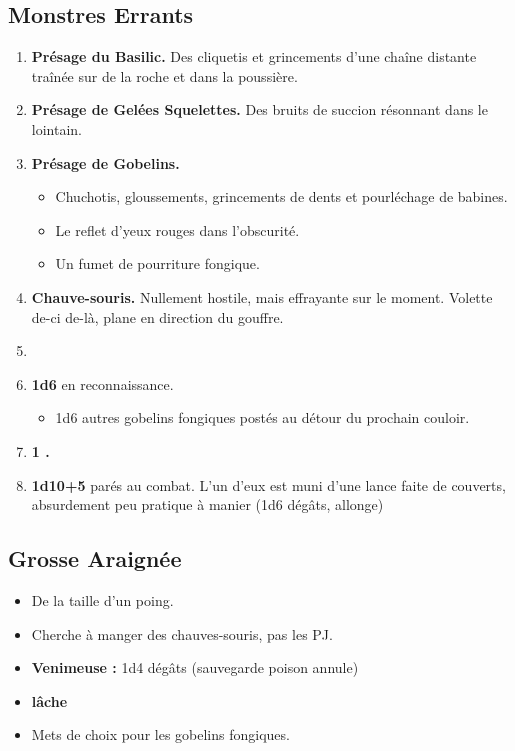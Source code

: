 \subsection{Monstres Errants}\label{monster:n3:errants}
\begin{enumerate}
  \item \textbf{Présage du Basilic.} 
  Des cliquetis et grincements d’une chaîne distante traînée sur de la roche et dans la poussière.
  \item \textbf{Présage de Gelées Squelettes.} 
  Des bruits de succion résonnant dans le lointain.
  \item \textbf{Présage de Gobelins.} 
  \begin{itemize}
    \item Chuchotis, gloussements, grincements de dents et pourléchage de babines. 
    \item Le reflet d’yeux rouges dans l’obscurité. 
    \item Un fumet de pourriture fongique.
  \end{itemize}  
  \item \textbf{Chauve-souris.} 
  Nullement hostile, mais effrayante sur le moment. 
  Volette de-ci de-là, plane en direction du gouffre.
  \item \textbf{} 
  \item \textbf{1d6 } en reconnaissance. 
  \begin{itemize}
    \item 1d6 autres gobelins fongiques postés au détour du prochain couloir.
  \end{itemize}
  \item  \textbf{1 .}
  \item  \textbf{1d10+5 } parés au combat. 
  L’un d’eux est muni d’une lance faite de couverts, absurdement peu pratique à manier (1d6 dégâts, allonge)
\end{enumerate}

\vfill
\pagebreak
\subsection{Grosse Araignée}\label{monster:n3:araignee}
  \begin{itemize}
  \item De la taille d’un poing.
  \item Cherche à manger des chauves-souris, pas les PJ.
  \item \textbf{Venimeuse : } 1d4 dégâts (sauvegarde poison annule) 
  \item \textbf{lâche}
  \item Mets de choix pour les gobelins fongiques.
\end{itemize} 

